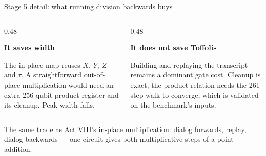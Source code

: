 \documentclass[aspectratio=169,11pt]{beamer}
\newcommand{\blocktitle}[1]{{\bfseries #1}\par\vskip1mm}
\begin{document}
\begin{frame}{Stage 5 detail: what running division backwards buys}
  \begin{columns}[T]
    \begin{column}{0.48\textwidth}
      \begin{panel}[equal height group=s5]
        \blocktitle{It saves width}
        \small The in-place map reuses $X$, $Y$, $Z$ and $\tau$. A straightforward out-of-place multiplication would need an extra 256-qubit product register and its cleanup. Peak width falls.
      \end{panel}
    \end{column}
    \begin{column}{0.48\textwidth}
      \begin{panel}[equal height group=s5]
        \blocktitle{It does not save Toffolis}
        \small Building and replaying the transcript remains a dominant gate cost. Cleanup is exact; the product relation needs the 261-step walk to converge, which is validated on the benchmark's inputs.
      \end{panel}
    \end{column}
  \end{columns}
  \vskip3mm
  \begin{takeaway}The same trade as Act VIII's in-place multiplication: dialog forwards, replay, dialog backwards --- one circuit gives both multiplicative steps of a point addition.\end{takeaway}
\end{frame}
\end{document}
